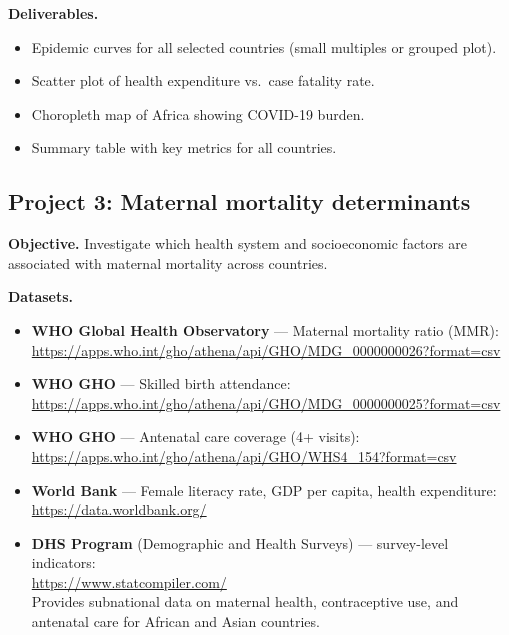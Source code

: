\textbf{Deliverables.}
\begin{itemize}
  \item Epidemic curves for all selected countries (small multiples or grouped plot).
  \item Scatter plot of health expenditure vs.\ case fatality rate.
  \item Choropleth map of Africa showing COVID-19 burden.
  \item Summary table with key metrics for all countries.
\end{itemize}

\subsection{Project 3: Maternal mortality determinants}

\textbf{Objective.} Investigate which health system and socioeconomic factors are associated with maternal mortality across countries.

\textbf{Datasets.}
\begin{itemize}
  \item \textbf{WHO Global Health Observatory} --- Maternal mortality ratio (MMR):\\
  \url{https://apps.who.int/gho/athena/api/GHO/MDG_0000000026?format=csv}
  \item \textbf{WHO GHO} --- Skilled birth attendance:\\
  \url{https://apps.who.int/gho/athena/api/GHO/MDG_0000000025?format=csv}
  \item \textbf{WHO GHO} --- Antenatal care coverage (4+ visits):\\
  \url{https://apps.who.int/gho/athena/api/GHO/WHS4_154?format=csv}
  \item \textbf{World Bank} --- Female literacy rate, GDP per capita, health expenditure:\\
  \url{https://data.worldbank.org/}
  \item \textbf{DHS Program} (Demographic and Health Surveys) --- survey-level indicators:\\
  \url{https://www.statcompiler.com/}\\
  Provides subnational data on maternal health, contraceptive use, and antenatal care for African and Asian countries.
\end{itemize}

